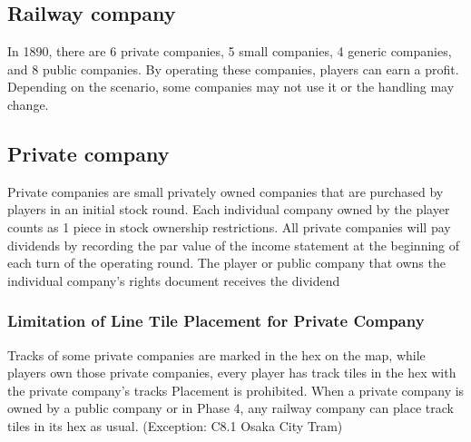 \documentclass{article}
\begin{document}
\begin{CJK}{UTF8}{min}




\section{Railway company}
In 1890, there are 6 private companies, 5 small companies, 4 generic
companies, and 8 public companies. By operating these companies,
players can earn a profit. Depending on the scenario, some companies
may not use it or the handling may change.

\subsection{Private company}
Private companies are small privately owned companies that are
purchased by players in an initial stock round. Each individual
company owned by the player counts as 1 piece in stock ownership
restrictions. All private companies will pay dividends by recording
the par value of the income statement at the beginning of each turn of
the operating round. The player or public company that owns the
individual company's rights document receives the dividend

\subsubsection{Limitation of Line Tile Placement for Private Company}
Tracks of some private companies are marked in the hex on the map,
while players own those private companies, every player has track
tiles in the hex with the private company's tracks Placement is
prohibited. When a private company is owned by a public company or in
Phase 4, any railway company can place track tiles in its hex as
usual. (Exception: C8.1 Osaka City Tram)


\end{CJK}
\end{document}
